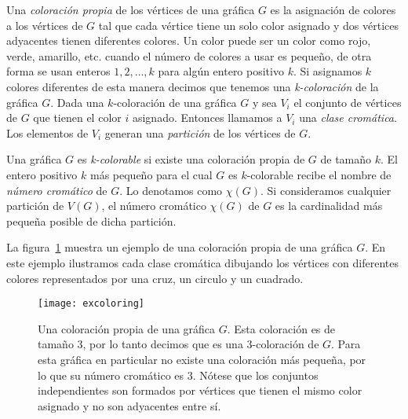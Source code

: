 Una \emph{coloración propia} de los vértices de una gráfica $G$ es la asignación
de colores a los vértices de $G$ tal que cada vértice tiene un solo color
asignado y dos vértices adyacentes tienen diferentes colores.
Un color puede ser un color como rojo, verde, amarillo, etc. cuando el número
de colores a usar es pequeño, de otra forma se usan enteros $1,2,\dots,k$
para algún entero positivo $k$. Si asignamos $k$ colores
diferentes de esta manera decimos que tenemos una \emph{k-coloración} de la gráfica $G$.
Dada una $k$-coloración de una gráfica $G$ y sea $V_i$ el conjunto de vértices
de $G$ que tienen el color $i$ asignado. Entonces llamamos a $V_i$
una \emph{clase cromática}. Los elementos de $V_i$ generan una \emph{partición}
de los vértices de $G$.

Una gráfica $G$ es \emph{k-colorable} si existe una coloración propia de $G$ de tamaño $k$.
El entero positivo $k$ más pequeño para el cual $G$ es $k$-colorable recibe el nombre
de \emph{número cromático} de $G$. Lo denotamos como $\chi(G)$.
Si consideramos cualquier partición de $V(G)$, el número cromático $\chi(G)$ de $G$ es la
cardinalidad más pequeña posible de dicha partición.

La figura~\ref{fig:excoloring} muestra un ejemplo de una coloración propia de una gráfica $G$.
En este ejemplo ilustramos cada clase cromática dibujando los vértices con diferentes colores
representados por una cruz, un circulo y un cuadrado.
\begin{figure}[htpb]
  \centering
  \texttt{[image: excoloring]}
  \caption{Una coloración propia de una gráfica $G$. Esta coloración es de tamaño 3, por
  lo tanto decimos que es una 3-coloración de $G$. Para esta gráfica en particular
  no existe una coloración más pequeña, por lo que su número cromático es 3. Nótese
  que los conjuntos independientes son formados por vértices que tienen el mismo
  color asignado y no son adyacentes entre sí.}
  \label{fig:excoloring}
\end{figure}
